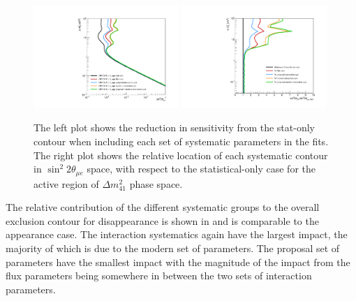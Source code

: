 \begin{figure}[h!]
    \centering
    \includegraphics[width = 0.49\textwidth]{figures-chap6/exclusion_contours/nue_app_syst_groups.pdf}
    \includegraphics[width = 0.49\textwidth]{figures-chap6/exclusion_contours/nue_app_syst_groups_ratios.pdf}
    \caption[Impact of the different systematic parameter groups on the \nue appearance sensitivity.]{The left plot shows the reduction in sensitivity from the stat-only contour when including each set of systematic parameters in the fits. The right plot shows the relative location of each systematic contour in $\sin^{2}2\theta_{\mu e}$ space, with respect to the statistical-only case for the active region of $\Delta m_{41}^{2}$ phase space.}
    \label{fig:nue_app_syst_group_sensitivities}
\end{figure}

The relative contribution of the different systematic groups to the overall exclusion contour for \nue disappearance is shown in  and is comparable to the \nue appearance case. The interaction systematics again have the largest impact, the majority of which is due to the modern set of parameters. The proposal set of parameters have the smallest impact with the magnitude of the impact from the flux parameters being somewhere in between the two sets of interaction parameters.


